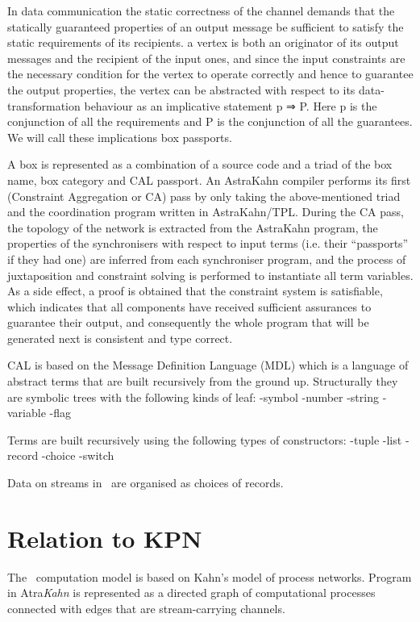 In data communication the static correctness of the channel demands that the statically guaranteed properties of an output message be sufficient to satisfy the static requirements of its recipients.
a vertex is both an originator of its output messages and the recipient of the input ones, and since the input constraints are the necessary condition for the vertex to operate correctly and hence to guarantee the output properties, the vertex can be abstracted with
respect to its data-transformation behaviour as an implicative statement p ⇒ P. Here p is the conjunction of all the requirements and P is the conjunction of all the guarantees. We will call these implications box passports.

A box is represented as a combination of a source code and a triad of the box name, box category and CAL passport. An AstraKahn compiler performs its first (Constraint Aggregation or CA) pass by only taking the above-mentioned triad and the coordination program written in AstraKahn/TPL. During the CA pass, the topology of the network is extracted from the AstraKahn program, the properties of the synchronisers with respect to input terms (i.e. their “passports” if they had one) are inferred from each synchroniser program, and the process of juxtaposition and constraint solving is performed to instantiate all term variables. As a side effect, a proof is obtained that the constraint system is satisfiable, which indicates that all components have received sufficient assurances to guarantee their output, and consequently the whole program that will be generated next is consistent and type correct.

CAL is based on the Message Definition Language (MDL) which is a language of abstract terms that are built recursively from the ground up. Structurally they are symbolic trees with the following kinds of leaf:
-symbol
-number
-string
-variable
-flag

Terms are built recursively using the following types of constructors:
-tuple
-list
-record
-choice
-switch


Data on streams in \ak\ are organised as choices of records.


    \section{Relation to KPN}
The \ak\ computation model is based on Kahn's model of process networks. Program in Atra\emph{Kahn} is represented as a directed graph of computational processes connected with edges that are stream-carrying channels.

